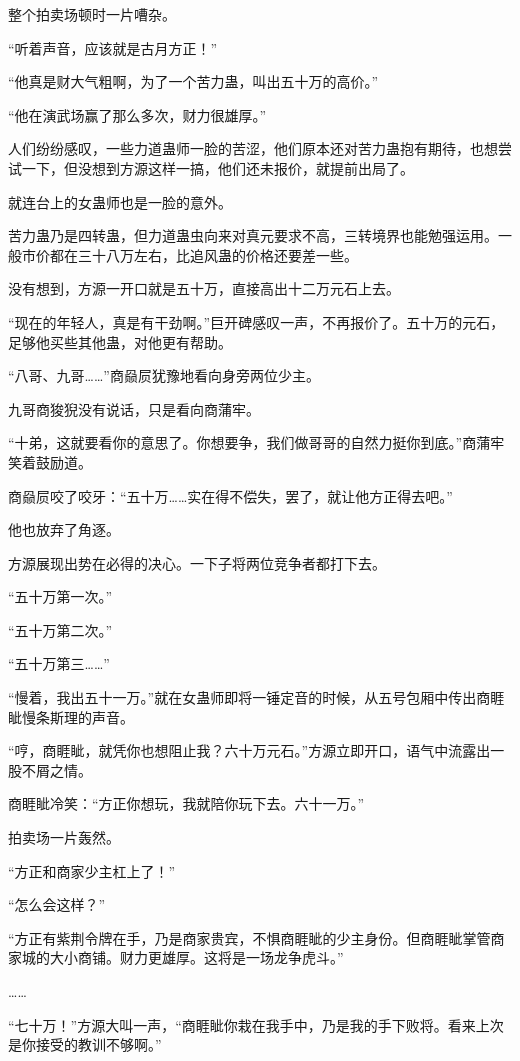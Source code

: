 \begin{this_body}
整个拍卖场顿时一片嘈杂。

“听着声音，应该就是古月方正！”

“他真是财大气粗啊，为了一个苦力蛊，叫出五十万的高价。”

“他在演武场赢了那么多次，财力很雄厚。”

人们纷纷感叹，一些力道蛊师一脸的苦涩，他们原本还对苦力蛊抱有期待，也想尝试一下，但没想到方源这样一搞，他们还未报价，就提前出局了。

就连台上的女蛊师也是一脸的意外。

苦力蛊乃是四转蛊，但力道蛊虫向来对真元要求不高，三转境界也能勉强运用。一般市价都在三十八万左右，比追风蛊的价格还要差一些。

没有想到，方源一开口就是五十万，直接高出十二万元石上去。

“现在的年轻人，真是有干劲啊。”巨开碑感叹一声，不再报价了。五十万的元石，足够他买些其他蛊，对他更有帮助。

“八哥、九哥……”商赑屃犹豫地看向身旁两位少主。

九哥商狻猊没有说话，只是看向商蒲牢。

“十弟，这就要看你的意思了。你想要争，我们做哥哥的自然力挺你到底。”商蒲牢笑着鼓励道。

商赑屃咬了咬牙：“五十万……实在得不偿失，罢了，就让他方正得去吧。”

他也放弃了角逐。

方源展现出势在必得的决心。一下子将两位竞争者都打下去。

“五十万第一次。”

“五十万第二次。”

“五十万第三……”

“慢着，我出五十一万。”就在女蛊师即将一锤定音的时候，从五号包厢中传出商睚眦慢条斯理的声音。

“哼，商睚眦，就凭你也想阻止我？六十万元石。”方源立即开口，语气中流露出一股不屑之情。

商睚眦冷笑：“方正你想玩，我就陪你玩下去。六十一万。”

拍卖场一片轰然。

“方正和商家少主杠上了！”

“怎么会这样？”

“方正有紫荆令牌在手，乃是商家贵宾，不惧商睚眦的少主身份。但商睚眦掌管商家城的大小商铺。财力更雄厚。这将是一场龙争虎斗。”

……

“七十万！”方源大叫一声，“商睚眦你栽在我手中，乃是我的手下败将。看来上次是你接受的教训不够啊。”


\end{this_body}

